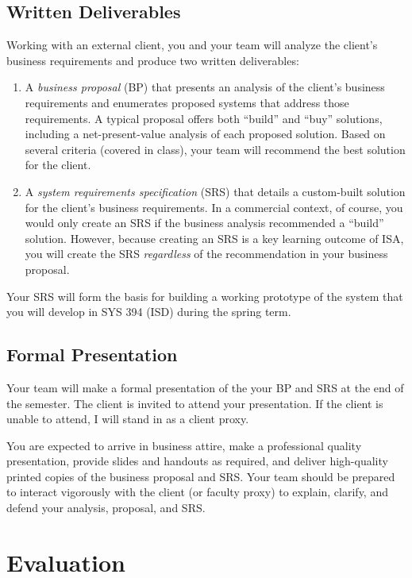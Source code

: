 \documentclass{article}
\begin{document}
\subsection{Written Deliverables}
\label{sec:orgheadline5}
Working with an external client,
you and your team
will analyze the client's business requirements
and produce two written deliverables:
\begin{enumerate}
\item A \emph{business proposal} (BP) that presents an analysis
of the client's business requirements
and enumerates proposed systems
that address those requirements.
A typical proposal
offers both ``build'' and ``buy'' solutions,
including a net-present-value analysis of each proposed solution.
Based on several criteria (covered in class),
your team will recommend the best solution for the client.
\item A \emph{system requirements specification} (SRS)
that details a custom-built solution for the client's business requirements.
In a commercial context, of course,
you would only create an SRS
if the business analysis recommended a ``build'' solution.
However, because creating an SRS is a key learning outcome of ISA,
you will create the SRS \emph{regardless} of the recommendation in your business proposal.
\end{enumerate}
Your SRS will form the basis for building a working prototype of the system
that you will develop in SYS 394 (ISD) during the spring term.
\subsection{Formal Presentation}
\label{sec:orgheadline6}
Your team will make a formal presentation of the your BP and SRS at the end
of the semester. The client is invited to attend your presentation. If the client is
unable to attend, I will stand in as a client proxy.

You are expected to arrive in business attire, make a professional quality presentation,
provide slides and handouts as required, and deliver high-quality printed copies of the
business proposal and SRS. Your team should be prepared to interact vigorously with the
client (or faculty proxy) to explain, clarify, and defend your analysis, proposal, and
SRS.

\newpage
\section{Evaluation}
\label{sec:orgheadline10}
\end{document}
